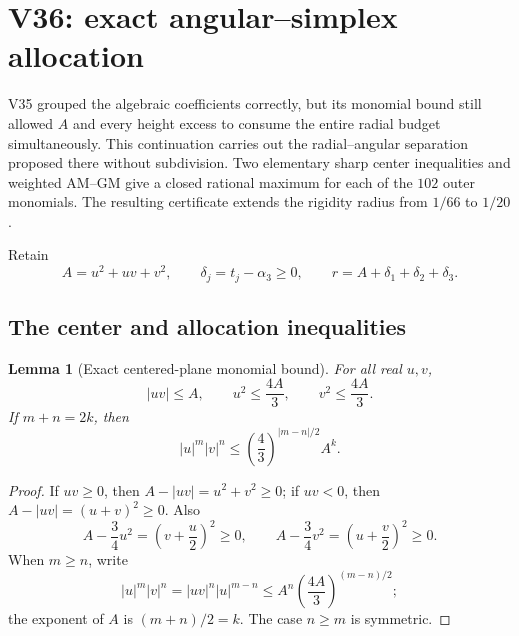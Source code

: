 \documentclass[11pt]{article}
\newtheorem{lemma}[theorem]{Lemma}
\theoremstyle{definition}
\theoremstyle{remark}
\begin{document}


\section{V36: exact angular--simplex allocation}
\label{sec:f2v36-simplex-allocation}

V35 grouped the algebraic coefficients correctly, but its monomial bound
still allowed \(A\) and every height excess to consume the entire radial
budget simultaneously.  This continuation carries out the radial--angular
separation proposed there without subdivision.  Two elementary sharp
center inequalities and weighted AM--GM give a closed rational maximum for
each of the \(102\) outer monomials.  The resulting certificate extends the
rigidity radius from \(1/66\) to \(1/20\).

Retain
\[
 A=u^2+uv+v^2,\qquad
 \delta_j=t_j-\alpha_3\geq0,\qquad
 r=A+\delta_1+\delta_2+\delta_3.
\tag{N36.1}
\]

\subsection{The center and allocation inequalities}

\begin{lemma}[Exact centered-plane monomial bound]
\label{lem:f2v36-center-monomial}
For all real \(u,v\),
\[
 |uv|\leq A,\qquad
 u^2\leq\frac{4A}{3},\qquad
 v^2\leq\frac{4A}{3}.
\tag{N36.2}
\]
If \(m+n=2k\), then
\[
 \boxed{
 |u|^m|v|^n
 \leq
 \left(\frac43\right)^{|m-n|/2}A^k.}
\tag{N36.3}
\]
\end{lemma}

\begin{proof}
If \(uv\geq0\), then \(A-|uv|=u^2+v^2\geq0\); if \(uv<0\), then
\(A-|uv|=(u+v)^2\geq0\).  Also
\[
 A-\frac34u^2=\left(v+\frac u2\right)^2\geq0,
 \qquad
 A-\frac34v^2=\left(u+\frac v2\right)^2\geq0.
\tag{N36.4}
\]
When \(m\geq n\), write
\[
 |u|^m|v|^n=|uv|^n|u|^{m-n}
 \leq A^n\left(\frac{4A}{3}\right)^{(m-n)/2};
\tag{N36.5}
\]
the exponent of \(A\) is \((m+n)/2=k\).  The case \(n\geq m\) is
symmetric.
\end{proof}
\end{document}
